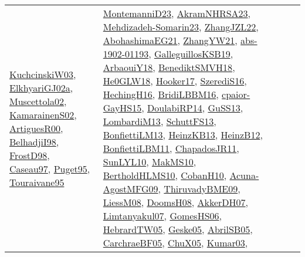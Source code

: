 {\begin{longtable}{lp{3cm}>{\raggedright}p{6cm}>{\raggedright}p{6cm}p{8cm}}
\href{articles/KuchcinskiW03.pdf}{KuchcinskiW03}\cite{KuchcinskiW03}, \href{papers/ElkhyariGJ02a.pdf}{ElkhyariGJ02a}\cite{ElkhyariGJ02a}, \href{papers/Muscettola02.pdf}{Muscettola02}\cite{Muscettola02}, \href{papers/KamarainenS02.pdf}{KamarainenS02}\cite{KamarainenS02}, \href{articles/ArtiguesR00.pdf}{ArtiguesR00}\cite{ArtiguesR00}, \href{articles/BelhadjiI98.pdf}{BelhadjiI98}\cite{BelhadjiI98}, \href{papers/FrostD98.pdf}{FrostD98}\cite{FrostD98}, \href{papers/Caseau97.pdf}{Caseau97}\cite{Caseau97}, \href{papers/Puget95.pdf}{Puget95}\cite{Puget95}, \href{papers/Touraivane95.pdf}{Touraivane95}\cite{Touraivane95} & \href{articles/MontemanniD23.pdf}{MontemanniD23}\cite{MontemanniD23}, \href{articles/AkramNHRSA23.pdf}{AkramNHRSA23}\cite{AkramNHRSA23}, \href{papers/Mehdizadeh-Somarin23.pdf}{Mehdizadeh-Somarin23}\cite{Mehdizadeh-Somarin23}, \href{papers/ZhangJZL22.pdf}{ZhangJZL22}\cite{ZhangJZL22}, \href{articles/AbohashimaEG21.pdf}{AbohashimaEG21}\cite{AbohashimaEG21}, \href{articles/ZhangYW21.pdf}{ZhangYW21}\cite{ZhangYW21}, \href{articles/abs-1902-01193.pdf}{abs-1902-01193}\cite{abs-1902-01193}, \href{papers/GalleguillosKSB19.pdf}{GalleguillosKSB19}\cite{GalleguillosKSB19}, \href{papers/ArbaouiY18.pdf}{ArbaouiY18}\cite{ArbaouiY18}, \href{papers/BenediktSMVH18.pdf}{BenediktSMVH18}\cite{BenediktSMVH18}, \href{papers/He0GLW18.pdf}{He0GLW18}\cite{He0GLW18}, \href{papers/Hooker17.pdf}{Hooker17}\cite{Hooker17}, \href{papers/SzerediS16.pdf}{SzerediS16}\cite{SzerediS16}, \href{papers/HechingH16.pdf}{HechingH16}\cite{HechingH16}, \href{papers/BridiLBBM16.pdf}{BridiLBBM16}\cite{BridiLBBM16}, \href{papers/cpaior-GayHS15.pdf}{cpaior-GayHS15}\cite{cpaior-GayHS15}, \href{papers/DoulabiRP14.pdf}{DoulabiRP14}\cite{DoulabiRP14}, \href{papers/GuSS13.pdf}{GuSS13}\cite{GuSS13}, \href{papers/LombardiM13.pdf}{LombardiM13}\cite{LombardiM13}, \href{papers/SchuttFS13.pdf}{SchuttFS13}\cite{SchuttFS13}, \href{papers/BonfiettiLM13.pdf}{BonfiettiLM13}\cite{BonfiettiLM13}, \href{papers/HeinzKB13.pdf}{HeinzKB13}\cite{HeinzKB13}, \href{papers/HeinzB12.pdf}{HeinzB12}\cite{HeinzB12}, \href{papers/BonfiettiLBM11.pdf}{BonfiettiLBM11}\cite{BonfiettiLBM11}, \href{papers/ChapadosJR11.pdf}{ChapadosJR11}\cite{ChapadosJR11}, \href{papers/SunLYL10.pdf}{SunLYL10}\cite{SunLYL10}, \href{papers/MakMS10.pdf}{MakMS10}\cite{MakMS10}, \href{papers/BertholdHLMS10.pdf}{BertholdHLMS10}\cite{BertholdHLMS10}, \href{papers/CobanH10.pdf}{CobanH10}\cite{CobanH10}, \href{papers/Acuna-AgostMFG09.pdf}{Acuna-AgostMFG09}\cite{Acuna-AgostMFG09}, \href{papers/ThiruvadyBME09.pdf}{ThiruvadyBME09}\cite{ThiruvadyBME09}, \href{articles/LiessM08.pdf}{LiessM08}\cite{LiessM08}, \href{papers/DoomsH08.pdf}{DoomsH08}\cite{DoomsH08}, \href{papers/AkkerDH07.pdf}{AkkerDH07}\cite{AkkerDH07}, \href{papers/Limtanyakul07.pdf}{Limtanyakul07}\cite{Limtanyakul07}, \href{papers/GomesHS06.pdf}{GomesHS06}\cite{GomesHS06}, \href{papers/HebrardTW05.pdf}{HebrardTW05}\cite{HebrardTW05}, \href{papers/Geske05.pdf}{Geske05}\cite{Geske05}, \href{papers/AbrilSB05.pdf}{AbrilSB05}\cite{AbrilSB05}, \href{papers/CarchraeBF05.pdf}{CarchraeBF05}\cite{CarchraeBF05}, \href{papers/ChuX05.pdf}{ChuX05}\cite{ChuX05}, \href{papers/Kumar03.pdf}{Kumar03}\cite{Kumar03}, 
\end{longtable}}
